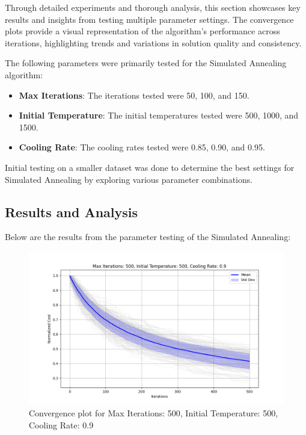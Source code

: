 \documentclass{article}
\begin{document}
    Through detailed experiments and thorough analysis, this section showcases key results and insights from testing multiple parameter settings.
    The convergence plots provide a visual representation of the algorithm’s performance across iterations, highlighting trends and variations in solution quality and consistency.

    The following parameters were primarily tested for the Simulated Annealing algorithm:

    \begin{itemize}
        \item \textbf{Max Iterations}: The iterations tested were 50, 100, and 150.
        \item \textbf{Initial Temperature}: The initial temperatures tested were 500, 1000, and 1500.
        \item \textbf{Cooling Rate}: The cooling rates tested were 0.85, 0.90, and 0.95.
    \end{itemize}

    Initial testing on a smaller dataset was done to determine the best settings for Simulated Annealing by exploring various parameter combinations.

    \subsection{Results and Analysis}
    Below are the results from the parameter testing of the Simulated Annealing:

    \begin{figure}[H]
        \centering
        \includegraphics[width=\textwidth]{simulated_annealing/max_iter_500_init_temp_500_cooling_rate_0.9}
        \caption{Convergence plot for Max Iterations: 500, Initial Temperature: 500, Cooling Rate: 0.9}
        \label{fig:sa_500_500_0.9}
    \end{figure}
\end{document}
